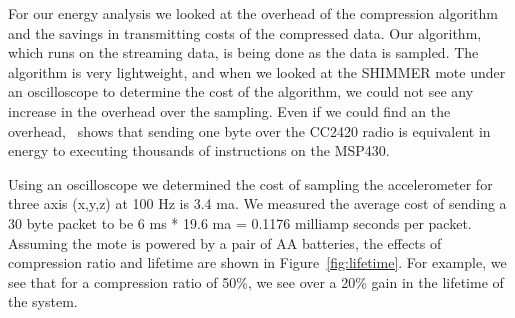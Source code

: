 For our energy analysis we looked at the overhead of the compression
algorithm and the savings in transmitting costs of the compressed
data.  Our algorithm, which runs on the streaming data, is being done
as the data is sampled.  The algorithm is very lightweight, and when
we looked at the SHIMMER mote under an oscilloscope to determine the
cost of the algorithm, we could not see any increase in the overhead
over the sampling.  Even if we could find an the
overhead,~\cite{s-lzw} shows that sending one byte over the CC2420
radio is equivalent in energy to executing thousands of instructions
on the MSP430.  

Using an oscilloscope we determined the cost of sampling the
accelerometer for three axis (x,y,z) at 100 Hz is 3.4 ma.  We measured
the average cost of sending a 30 byte packet to be 6 ms * 19.6 ma =
0.1176 milliamp seconds per packet.  Assuming the mote is powered by a pair of
AA batteries, the effects of compression ratio and lifetime are
shown in Figure~\ref{fig:lifetime}.  For example, we see that for a
compression ratio of 50\%, we see over a 20\% gain in the lifetime of
the system.  



